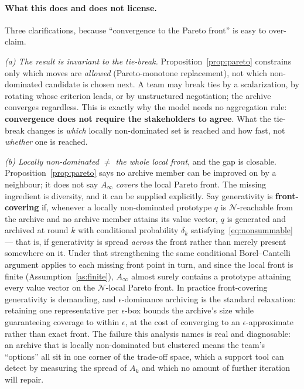 \documentclass[11pt]{article}
\begin{document}
\paragraph{What this does and does not license.} Three clarifications, because ``convergence to the Pareto front'' is easy to over-claim.

\emph{(a) The result is invariant to the tie-break.} Proposition~\ref{prop:pareto} constrains only which moves are \emph{allowed} (Pareto-monotone replacement), not which non-dominated candidate is chosen next. A team may break ties by a scalarization, by rotating whose criterion leads, or by unstructured negotiation; the archive converges regardless. This is exactly why the model needs no aggregation rule: \textbf{convergence does not require the stakeholders to agree}. What the tie-break changes is \emph{which} locally non-dominated set is reached and how fast, not \emph{whether} one is reached.

\emph{(b) Locally non-dominated $\ne$ the whole local front}, and the gap is closable. Proposition~\ref{prop:pareto} says no archive member can be improved on by a neighbour; it does not say $A_\infty$ \emph{covers} the local Pareto front. The missing ingredient is diversity, and it can be supplied explicitly. Say generativity is \textbf{front-covering} if, whenever a locally non-dominated prototype $q$ is $\mathcal{N}$-reachable from the archive and no archive member attains its value vector, $q$ is generated and archived at round $k$ with conditional probability $\delta_k$ satisfying~\eqref{eq:nonsummable} --- that is, if generativity is spread \emph{across} the front rather than merely present somewhere on it. Under that strengthening the same conditional Borel--Cantelli argument applies to each missing front point in turn, and since the local front is finite (Assumption~\ref{as:finite}), $A_\infty$ almost surely contains a prototype attaining every value vector on the $\mathcal{N}$-local Pareto front. In practice front-covering generativity is demanding, and $\epsilon$-dominance archiving \citep{laumanns2002} is the standard relaxation: retaining one representative per $\epsilon$-box bounds the archive's size while guaranteeing coverage to within $\epsilon$, at the cost of converging to an $\epsilon$-approximate rather than exact front. The failure this analysis names is real and diagnosable: an archive that is locally non-dominated but clustered means the team's ``options'' all sit in one corner of the trade-off space, which a support tool can detect by measuring the spread of $A_k$ and which no amount of further iteration will repair.
\end{document}
